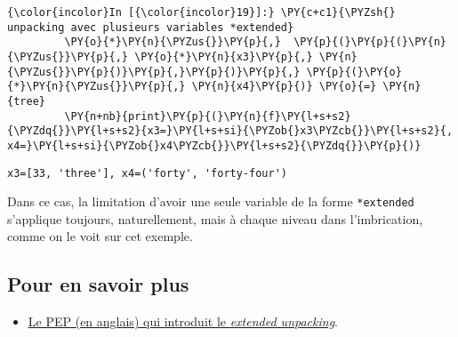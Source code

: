    \begin{Verbatim}[commandchars=\\\{\},frame=single,framerule=0.3mm,rulecolor=\color{cellframecolor}]
{\color{incolor}In [{\color{incolor}19}]:} \PY{c+c1}{\PYZsh{} unpacking avec plusieurs variables *extended}
         \PY{o}{*}\PY{n}{\PYZus{}}\PY{p}{,}  \PY{p}{(}\PY{p}{(}\PY{n}{\PYZus{}}\PY{p}{,} \PY{o}{*}\PY{n}{x3}\PY{p}{,} \PY{n}{\PYZus{}}\PY{p}{)}\PY{p}{,}\PY{p}{)}\PY{p}{,} \PY{p}{(}\PY{o}{*}\PY{n}{\PYZus{}}\PY{p}{,} \PY{n}{x4}\PY{p}{)} \PY{o}{=} \PY{n}{tree}
         \PY{n+nb}{print}\PY{p}{(}\PY{n}{f}\PY{l+s+s2}{\PYZdq{}}\PY{l+s+s2}{x3=}\PY{l+s+si}{\PYZob{}x3\PYZcb{}}\PY{l+s+s2}{, x4=}\PY{l+s+si}{\PYZob{}x4\PYZcb{}}\PY{l+s+s2}{\PYZdq{}}\PY{p}{)}
\end{Verbatim}


    \begin{Verbatim}[commandchars=\\\{\},frame=single,framerule=0.3mm,rulecolor=\color{cellframecolor}]
x3=[33, 'three'], x4=('forty', 'forty-four')
\end{Verbatim}

    Dans ce cas, la limitation d'avoir une seule variable de la forme
\texttt{*extended} s'applique toujours, naturellement, mais à chaque
niveau dans l'imbrication, comme on le voit sur cet exemple.

    \hypertarget{pour-en-savoir-plus}{%
\subsection{Pour en savoir plus}\label{pour-en-savoir-plus}}

\begin{itemize}
\tightlist
\item
  \href{https://www.python.org/dev/peps/pep-3132/}{Le PEP (en anglais)
  qui introduit le \emph{extended unpacking}}.
\end{itemize}


    
    
    
